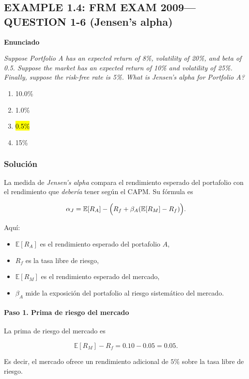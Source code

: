 ﻿\subsection{EXAMPLE 1.4: FRM EXAM 2009---QUESTION 1-6 (Jensen's alpha)}

\textbf{Enunciado}

\emph{Suppose Portfolio A has an expected return of 8\%, volatility of 20\%, and beta of 0.5. Suppose the market has an expected return of 10\% and volatility of 25\%. Finally, suppose the risk-free rate is 5\%. What is Jensen’s alpha for Portfolio A?}
\begin{enumerate}[label=\alph*.]
\item 10.0\%
\item 1.0\%
\item \hl{0.5\%}
\item 15\%
\end{enumerate}

\subsubsection*{Solución}

La medida de \emph{Jensen's alpha} compara el rendimiento esperado del portafolio
con el rendimiento que \emph{debería} tener según el CAPM. Su fórmula es

\[
\alpha_J
=
\mathbb E[R_A]
-
\Bigl(
R_f+\beta_A(\mathbb E[R_M]-R_f)
\Bigr).
\]

Aquí:

\begin{itemize}
    \item \(\mathbb E[R_A]\) es el rendimiento esperado del portafolio \(A\),
    \item \(R_f\) es la tasa libre de riesgo,
    \item \(\mathbb E[R_M]\) es el rendimiento esperado del mercado,
    \item \(\beta_A\) mide la exposición del portafolio al riesgo sistemático del mercado.
\end{itemize}

\paragraph{Paso 1. Prima de riesgo del mercado}

La prima de riesgo del mercado es

\[
\mathbb E[R_M]-R_f=0.10-0.05=0.05.
\]

Es decir, el mercado ofrece un rendimiento adicional de \(5\%\) sobre la tasa libre de riesgo.

